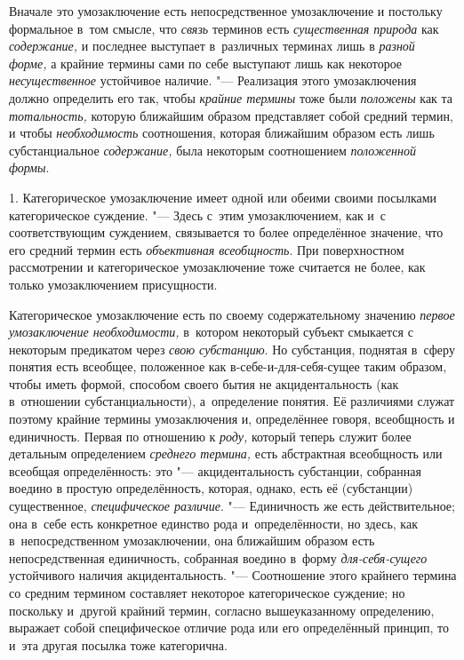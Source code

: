 Вначале это умозаключение есть непосредственное умозаключение
и постольку формальное в~том смысле, что
{\em связь} терминов есть
{\em существенная природа}
как {\em содержание,}
и последнее выступает в~различных терминах лишь в
{\em разной форме,} а
крайние термины сами по себе выступают лишь как некоторое
{\em несущественное}
устойчивое наличие. "--- Реализация этого
умозаключения должно определить его так, чтобы
{\em крайние термины
}тоже были
{\em положены} как та
{\em тотальность,}
которую ближайшим образом представляет собой средний термин,
и чтобы {\em необходимость}
соотношения, которая ближайшим образом есть лишь
субстанциальное {\em содержание,}
была некоторым соотношением
{\em положенной формы}.


1. Категорическое умозаключение имеет одной или обеими своими
посылками категорическое
суждение.
"--- Здесь с~этим умозаключением, как и~с соответствующим
суждением, связывается то более определённое значение, что
его средний термин есть {\em объективная
всеобщность}. При поверхностном рассмотрении и
категорическое умозаключение тоже считается не более, как только
умозаключением присущности.

Категорическое умозаключение есть по своему содержательному
значению {\em первое умозаключение
необходимости,} в~котором некоторый субъект смыкается с
некоторым предикатом через {\em свою
субстанцию}. Но субстанция, поднятая в~сферу понятия есть
всеобщее, положенное как в-себе-и-для-себя-сущее таким образом, чтобы иметь
формой, способом своего бытия не акцидентальность (как в~отношении
субстанциальности), а~определение понятия. Её различиями служат поэтому
крайние термины умозаключения и, определённее говоря, всеобщность и
единичность. Первая по отношению к
{\em роду,} который
теперь служит более детальным определением
{\em среднего термина,}
есть абстрактная всеобщность или всеобщая определённость:
это "--- акцидентальность субстанции, собранная воедино в
простую определённость, которая, однако, есть её (субстанции) существенное,
{\em специфическое различие}. "---
Единичность же есть действительное; она в~себе есть
конкретное единство рода и~определённости, но здесь, как в~непосредственном
умозаключении, она ближайшим образом есть непосредственная единичность,
собранная воедино в~форму
{\em для-себя-сущего}
устойчивого наличия акцидентальность. "---
Соотношение этого крайнего термина со средним термином
составляет некоторое категорическое суждение; но поскольку и~другой крайний
термин, согласно вышеуказанному определению, выражает собой специфическое
отличие рода или его определённый принцип, то и~эта другая посылка тоже
категорична.

